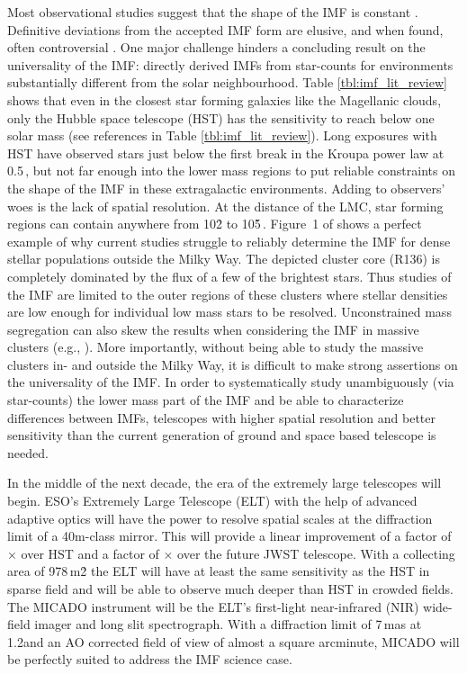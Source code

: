 Most observational studies suggest that the shape of the IMF is constant \citep{Lada2003-ip,Kroupa2002,Bastian2010}. Definitive deviations from the accepted IMF form are elusive, and when found, often controversial \citep{Van_Dokkum2010-gx,Conroy2012-hv,Drass2016-kp}. One major challenge hinders a concluding result on the universality of the IMF:  directly derived IMFs from star-counts for environments substantially different from the solar neighbourhood. 
Table \ref{tbl:imf_lit_review} shows that even in the closest star forming galaxies like the Magellanic clouds, only the Hubble space telescope (HST) has the sensitivity to reach below one solar mass (see references in Table \ref{tbl:imf_lit_review}). 
Long exposures with HST have observed stars just below the first break in the Kroupa power law at 0.5\,\msun \citep{dario2009,kalirai2013,geha2013}, but not far enough into the lower mass regions to put reliable constraints on the shape of the IMF in these extragalactic environments. 
Adding to observers' woes is the lack of spatial resolution. At the distance of the LMC, star forming regions can contain anywhere from 10\h2 to 10\h5\,\spae. 
Figure~1 of \citet{sirianni2000} shows a perfect example of why current studies struggle to reliably determine the IMF for dense stellar populations outside the Milky Way. The depicted cluster core (R136) is completely dominated by the flux of a few of the brightest stars.
Thus studies of the IMF are limited to the outer regions of these clusters where stellar densities are low enough for individual low mass stars to be resolved. Unconstrained mass segregation can also skew the results when considering the IMF in massive clusters (e.g., \citealt{Ascenso2009-de}). More importantly, without being able to study the massive clusters in- and outside the Milky Way, it is difficult to make strong assertions on the universality of the IMF. In order to systematically study unambiguously (via star-counts) the lower mass part of the IMF and be able to characterize differences between IMFs, telescopes with higher spatial resolution and better sensitivity than the current generation of ground and space based telescope is needed.

In the middle of the next decade, the era of the extremely large telescopes will begin. 
ESO's Extremely Large Telescope (ELT) \citep{eelt} with the help of advanced adaptive optics \citep{maory} will have the power to resolve spatial scales at the diffraction limit of a 40m-class mirror. This will provide a linear improvement of a factor of $\times$ over HST and a factor of $\times$ over the future JWST telescope. 
With a collecting area of 978\,m\h2 the ELT will have at least the same sensitivity as the HST in sparse field and will be able to observe much deeper than HST in crowded fields. 
The MICADO instrument \citep{micado2016, micado2018} will be the ELT's first-light near-infrared (NIR) wide-field imager and long slit spectrograph. 
With a diffraction limit of 7\,mas at 1.2\um and an AO corrected field of view of almost a square arcminute, MICADO will be perfectly suited to address the IMF science case. 

